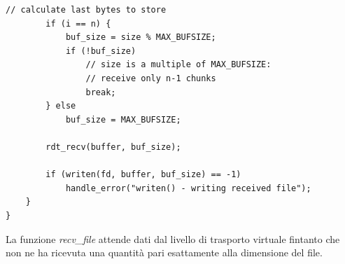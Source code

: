 \begin{lstlisting}[title=cmd\_commons.c]
		// calculate last bytes to store 
		if (i == n) {           
			buf_size = size % MAX_BUFSIZE;
			if (!buf_size)
				// size is a multiple of MAX_BUFSIZE:
				// receive only n-1 chunks
				break;          
		} else
			buf_size = MAX_BUFSIZE;
                                                                                              
		rdt_recv(buffer, buf_size);
                                                                                              
		if (writen(fd, buffer, buf_size) == -1)
			handle_error("writen() - writing received file");
	}
}
\end{lstlisting}
La funzione \emph{recv\_file} attende dati dal livello di trasporto virtuale
fintanto che non ne ha ricevuta una quantità pari esattamente alla dimensione
del file.




